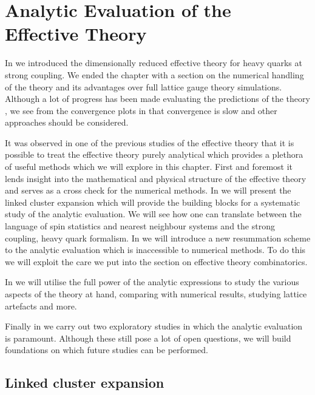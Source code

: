 \chapter{Analytic Evaluation of the Effective Theory} \label{chap5}

In  we introduced the dimensionally reduced effective theory for
heavy quarks at strong coupling. We ended the chapter with a section on the
numerical handling of the theory and its advantages over full lattice gauge
theory simulations. Although a lot of progress has been made evaluating the
predictions of the theory \citep{Fromm:2011qi,Fromm:2012eb,Langelage:2014vpa},
we see from the convergence plots in  that
convergence is slow and other approaches should be considered.

It was observed in one of the previous studies of the effective theory
\citep{Langelage:2014vpa} that it is possible to treat the effective theory
purely analytical which provides a plethora of useful methods which we will
explore in this chapter. First and foremost it lends insight into the
mathematical and physical structure of the effective theory and serves as a
cross check for the numerical methods. In  we will
present the linked cluster expansion which will provide the building blocks for
a systematic study of the analytic evaluation. We will see how one can translate
between the language of spin statistics and nearest neighbour systems and the
strong coupling, heavy quark formalism. In  we
will introduce a new resummation scheme to the analytic evaluation which is
inaccessible to numerical methods. To do this we will exploit the care we put
into the section on effective theory combinatorics.

In  we will utilise the full power of the analytic
expressions to study the various aspects of the theory at hand, comparing with
numerical results, studying lattice artefacts and more.

Finally in  we carry out two
exploratory studies in which the analytic evaluation is paramount. Although
these still pose a lot of open questions, we will build foundations on which
future studies can be performed.

\section{Linked cluster expansion} \label{sec:cluster_expansion}

